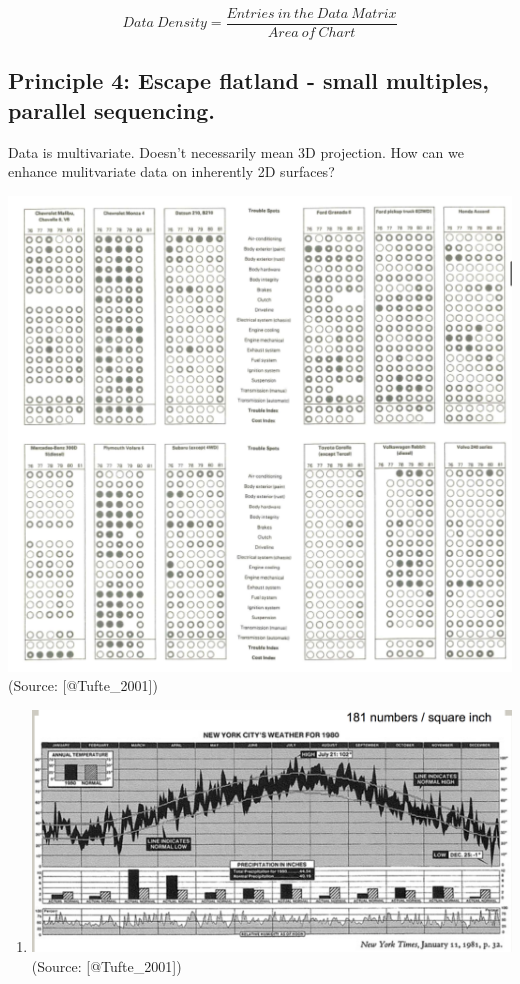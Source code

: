 \documentclass[]{book}
\providecommand{\tightlist}{%
  \setlength{\itemsep}{0pt}\setlength{\parskip}{0pt}}
\theoremstyle{definition}
\theoremstyle{definition}
\theoremstyle{definition}
\theoremstyle{remark}
\begin{document}
\[{Data \ Density} = \frac{{Entries \ in \ the \ Data \ Matrix}}{{Area \ of \ Chart}}\]

\subsection{Principle 4: Escape flatland - small multiples, parallel
sequencing.}\label{principle-4-escape-flatland---small-multiples-parallel-sequencing.}

Data is multivariate. Doesn't necessarily mean 3D projection. How can we
enhance mulitvariate data on inherently 2D surfaces?

\includegraphics{images/Tufte_figure8.png} (Source: {[}@Tufte\_2001{]})

\begin{enumerate}
\def\labelenumi{\arabic{enumi}.}
\setcounter{enumi}{1}
\tightlist
\item
  \includegraphics{images/Tufte_figure7.png} (Source:
  {[}@Tufte\_2001{]})
\end{enumerate}
\end{document}
